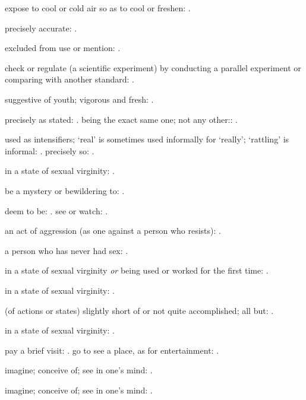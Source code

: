   expose to cool or cold air so as to cool or freshen: .

  precisely accurate: .

  excluded from use or mention: .

  check or regulate (a scientific experiment) by conducting a parallel experiment or comparing with another standard: .

  suggestive of youth; vigorous and fresh: .

  precisely as stated: . being the exact same one; not any other:: .

  used as intensifiers; `real' is sometimes used informally for `really'; `rattling' is informal: . precisely so: .

  in a state of sexual virginity: .

  be a mystery or bewildering to: .

  deem to be: . see or watch: .

  an act of aggression (as one against a person who resists): .

  a person who has never had sex: .

  in a state of sexual virginity \textit{or} being used or worked for the first time: .

  in a state of sexual virginity: .

  (of actions or states) slightly short of or not quite accomplished; all but: .

  in a state of sexual virginity: .

  pay a brief visit: . go to see a place, as for entertainment: .

  imagine; conceive of; see in one's mind: .

  imagine; conceive of; see in one's mind: .

